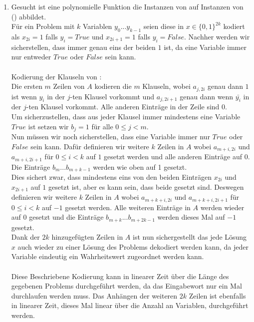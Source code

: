 \documentclass[a4paper,11pt]{scrartcl}
\begin{document}
\begin{enumerate}[label=(\alph*)]
	\item
		Gesucht ist eine polynomielle Funktion die Instanzen von  auf Instanzen von  () abbildet.\\
		Für ein  Problem mit $k$ Variablen $y_0 ... y_{k-1}$ seien diese in $x \in \{0,1\}^{2k}$ kodiert als $x_{2i} = 1$ falls $y_i = True$ und $x_{2i + 1} = 1$ falls $y_i = False$.
		Nachher werden wir sicherstellen, dass immer genau eins der beiden $1$ ist, da eine Variable immer nur entweder $True$ oder $False$ sein kann.\\
		\\
		Kodierung der Klauseln von :\\
		Die ersten $m$ Zeilen von $A$ kodieren die $m$ Klauseln, wobei $a_{j,2i}$ genau dann $1$ ist wenn $y_i$ in der $j$-ten Klausel vorkommt und $a_{j,2i+1}$ genau dann wenn $\bar{y_i}$ in der $j$-ten Klausel vorkommt. Alle anderen Einträge in der Zeile sind 0.\\
		Um sicherzustellen, dass aus jeder Klausel immer mindestens eine Variable $True$ ist setzen wir $b_j = 1$ für alle $0 \leq j < m$.\\
		Nun müssen wir noch sicherstellen, dass eine Variable immer nur $True$ oder $False$ sein kann. Dafür definieren wir weitere $k$ Zeilen in $A$ wobei $a_{m+i,2i}$ und $a_{m+i,2i+1}$ für $0 \leq i < k$ auf $1$ gesetzt werden und alle anderen Einträge auf $0$. Die Einträge $b_m ... b_{m+k-1}$ werden wie oben auf 1 gesetzt.\\
		Dies sichert zwar, dass mindestens eins von den beiden Einträgen $x_{2i}$ und $x_{2i + 1}$ auf $1$ gesetzt ist, aber es kann sein, dass beide gesetzt sind. Deswegen definieren wir weitere $k$ Zeilen in $A$ wobei $a_{m+k+i,2i}$ und $a_{m+k+i,2i+1}$ für $0 \leq i < k$ auf $-1$ gesetzt werden. Alle weiteren Einträge in $A$ werden wieder auf $0$ gesetzt und die Einträge $b_{m+k} ... b_{m+2k-1}$ werden dieses Mal auf $-1$ gesetzt.\\
		Dank der $2k$ hinzugefügten Zeilen in $A$ ist nun sichergestellt das jede Lösung $x$ auch wieder zu einer Lösung des  Problems dekodiert werden kann, da jeder Variable eindeutig ein Wahrheitswert zugeordnet werden kann.\\
		\\
		Diese Beschriebene Kodierung kann in linearer Zeit über die Länge des gegebenen  Problems durchgeführt werden, da das Eingabewort nur ein Mal durchlaufen werden muss. Das Anhängen der weiteren $2k$ Zeilen ist ebenfalls in linearer Zeit, dieses Mal linear über die Anzahl an Variablen, durchgeführt werden.\\

\end{enumerate}
\end{document}
